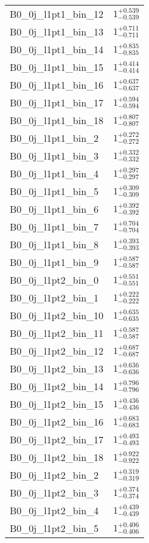 \begin{tabular}{|l|c|}
B0\_0j\_l1pt1\_bin\_12 & $1^{+0.539}_{-0.539}$ \\
B0\_0j\_l1pt1\_bin\_13 & $1^{+0.711}_{-0.711}$ \\
B0\_0j\_l1pt1\_bin\_14 & $1^{+0.835}_{-0.835}$ \\
B0\_0j\_l1pt1\_bin\_15 & $1^{+0.414}_{-0.414}$ \\
B0\_0j\_l1pt1\_bin\_16 & $1^{+0.637}_{-0.637}$ \\
B0\_0j\_l1pt1\_bin\_17 & $1^{+0.594}_{-0.594}$ \\
B0\_0j\_l1pt1\_bin\_18 & $1^{+0.807}_{-0.807}$ \\
B0\_0j\_l1pt1\_bin\_2 & $1^{+0.272}_{-0.272}$ \\
B0\_0j\_l1pt1\_bin\_3 & $1^{+0.332}_{-0.332}$ \\
B0\_0j\_l1pt1\_bin\_4 & $1^{+0.297}_{-0.297}$ \\
B0\_0j\_l1pt1\_bin\_5 & $1^{+0.309}_{-0.309}$ \\
B0\_0j\_l1pt1\_bin\_6 & $1^{+0.392}_{-0.392}$ \\
B0\_0j\_l1pt1\_bin\_7 & $1^{+0.704}_{-0.704}$ \\
B0\_0j\_l1pt1\_bin\_8 & $1^{+0.393}_{-0.393}$ \\
B0\_0j\_l1pt1\_bin\_9 & $1^{+0.587}_{-0.587}$ \\
B0\_0j\_l1pt2\_bin\_0 & $1^{+0.551}_{-0.551}$ \\
B0\_0j\_l1pt2\_bin\_1 & $1^{+0.222}_{-0.222}$ \\
B0\_0j\_l1pt2\_bin\_10 & $1^{+0.635}_{-0.635}$ \\
B0\_0j\_l1pt2\_bin\_11 & $1^{+0.587}_{-0.587}$ \\
B0\_0j\_l1pt2\_bin\_12 & $1^{+0.687}_{-0.687}$ \\
B0\_0j\_l1pt2\_bin\_13 & $1^{+0.636}_{-0.636}$ \\
B0\_0j\_l1pt2\_bin\_14 & $1^{+0.796}_{-0.796}$ \\
B0\_0j\_l1pt2\_bin\_15 & $1^{+0.436}_{-0.436}$ \\
B0\_0j\_l1pt2\_bin\_16 & $1^{+0.683}_{-0.683}$ \\
B0\_0j\_l1pt2\_bin\_17 & $1^{+0.493}_{-0.493}$ \\
B0\_0j\_l1pt2\_bin\_18 & $1^{+0.922}_{-0.922}$ \\
B0\_0j\_l1pt2\_bin\_2 & $1^{+0.319}_{-0.319}$ \\
B0\_0j\_l1pt2\_bin\_3 & $1^{+0.374}_{-0.374}$ \\
B0\_0j\_l1pt2\_bin\_4 & $1^{+0.439}_{-0.439}$ \\
B0\_0j\_l1pt2\_bin\_5 & $1^{+0.406}_{-0.406}$ \\

\end{tabular}
